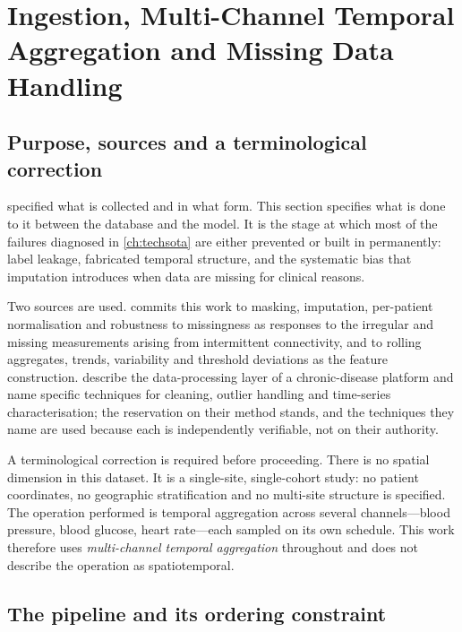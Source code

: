 \documentclass[12pt,a4paper,oneside]{report}
\begin{document}
\section{Ingestion, Multi-Channel Temporal Aggregation and Missing Data Handling}\label{sec:preprocessing}

\subsection*{Purpose, sources and a terminological correction}

 specified what is collected and in what form. This section specifies what is done to it between the database and the model. It is the stage at which most of the failures diagnosed in \cref{ch:techsota} are either prevented or built in permanently: label leakage, fabricated temporal structure, and the systematic bias that imputation introduces when data are missing for clinical reasons.

Two sources are used. \Textcite{cadrage2026} commits this work to masking, imputation, per-patient normalisation and robustness to missingness as responses to the irregular and missing measurements arising from intermittent connectivity, and to rolling aggregates, trends, variability and threshold deviations as the feature construction. \Textcite{liu2025review} describe the data-processing layer of a chronic-disease platform and name specific techniques for cleaning, outlier handling and time-series characterisation; the reservation on their method stands, and the techniques they name are used because each is independently verifiable, not on their authority.

A terminological correction is required before proceeding. There is no spatial dimension in this dataset. It is a single-site, single-cohort study: no patient coordinates, no geographic stratification and no multi-site structure is specified. The operation performed is temporal aggregation across several channels---blood pressure, blood glucose, heart rate---each sampled on its own schedule. This work therefore uses \emph{multi-channel temporal aggregation} throughout and does not describe the operation as spatiotemporal.

\subsection{The pipeline and its ordering constraint}\label{sec:pipeline}
\end{document}
